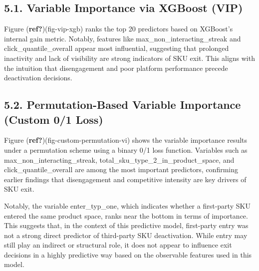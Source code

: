 \documentclass[
  letterpaper,
  DIV=11,
  numbers=noendperiod]{scrartcl}
\begin{document}
\subsection{5.1. Variable Importance via XGBoost
(VIP)}\label{variable-importance-via-xgboost-vip}

Figure (\textbf{ref?})(fig-vip-xgb) ranks the top 20 predictors based on
XGBoost's internal gain metric. Notably, features like
max\_non\_interacting\_streak and click\_quantile\_overall appear most
influential, suggesting that prolonged inactivity and lack of visibility
are strong indicators of SKU exit. This aligns with the intuition that
disengagement and poor platform performance precede deactivation
decisions.

\begin{figure}


\caption{\label{fig-vip-xgb}}

\end{figure}%

\subsection{5.2. Permutation-Based Variable Importance (Custom 0/1
Loss)}\label{permutation-based-variable-importance-custom-01-loss}

Figure (\textbf{ref?})(fig-custom-permutation-vi) shows the variable
importance results under a permutation scheme using a binary 0/1 loss
function. Variables such as max\_non\_interacting\_streak,
total\_sku\_type\_2\_in\_product\_space, and click\_quantile\_overall
are among the most important predictors, confirming earlier findings
that disengagement and competitive intensity are key drivers of SKU
exit.

Notably, the variable enter\_typ\_one, which indicates whether a
first-party SKU entered the same product space, ranks near the bottom in
terms of importance. This suggests that, in the context of this
predictive model, first-party entry was not a strong direct predictor of
third-party SKU deactivation. While entry may still play an indirect or
structural role, it does not appear to influence exit decisions in a
highly predictive way based on the observable features used in this
model.
\end{document}
